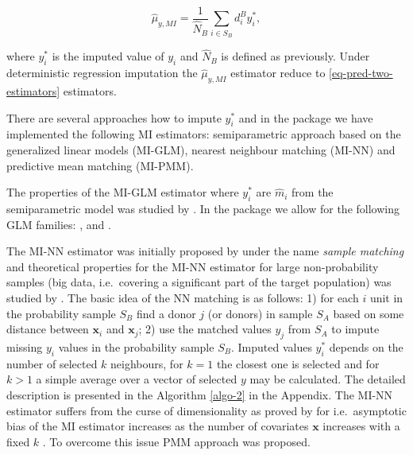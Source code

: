 \documentclass[
]{jss}
\begin{document}
\begin{equation}
\hat{\mu}_{y,MI}=\frac{1}{\hat{N}_{B}} \sum_{i \in S_{B}} d_i^{B} y_i^*, 
\end{equation}

where \(y_i^*\) is the imputed value of \(y_i\) and \(\hat{N}_{B}\) is
defined as previously. Under deterministic regression imputation the
\(\hat{\mu}_{y,MI}\) estimator reduce to \eqref{eq-pred-two-estimators}
estimators.

There are several approaches how to impute \(y_i^*\) and in the package
we have implemented the following MI estimators: semiparametric approach
based on the generalized linear models (MI-GLM), nearest neighbour
matching (MI-NN) and predictive mean matching (MI-PMM).

The properties of the MI-GLM estimator where \(y_i^*\) are \(\hat{m}_i\)
from the semiparametric model was studied by \citet{kim_combining_2021}.
In the  package we allow for the following GLM families:
,  and .

The MI-NN estimator was initially proposed by \citet{rivers2007sampling}
under the name \textit{sample matching} and theoretical properties for
the MI-NN estimator for large non-probability samples (big data,
i.e.~covering a significant part of the target population) was studied
by \citet{yang2021integration}. The basic idea of the NN matching is as
follows: 1) for each \(i\) unit in the probability sample \(S_B\) find a
donor \(j\) (or donors) in sample \(S_A\) based on some distance between
\(\boldsymbol{x}_i\) and \(\boldsymbol{x}_j\); 2) use the matched values
\(y_j\) from \(S_A\) to impute missing \(y_i\) values in the probability
sample \(S_B\). Imputed values \(y_i^*\) depends on the number of
selected \(k\) neighbours, for \(k=1\) the closest one is selected and
for \(k>1\) a simple average over a vector of selected \(y\) may be
calculated. The detailed description is presented in the Algorithm
\ref{algo-2} in the Appendix. The MI-NN estimator suffers from the curse
of dimensionality as proved by for i.e.~asymptotic bias of the MI
estimator increases as the number of covariates \(\boldsymbol{x}\)
increases with a fixed \(k\)
\citep{abadie2006large, yang_asymptotic_2020}. To overcome this issue
PMM approach was proposed.
\end{document}
